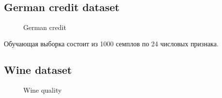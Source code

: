 \documentclass[12pt,twoside]{article}
\theoremstyle{plain}
\theoremstyle{remark}
\theoremstyle{definition}
\begin{document}
\newpage

\subsection{German credit dataset}

\begin{figure}[H]
      \caption{German credit}
\end{figure}




Обучающая выборка состоит из 1000 семплов по 24 числовых признака. 

\newpage

\subsection{Wine dataset}


\begin{figure}[H]
      \caption{Wine quality}
\end{figure}
\end{document}
